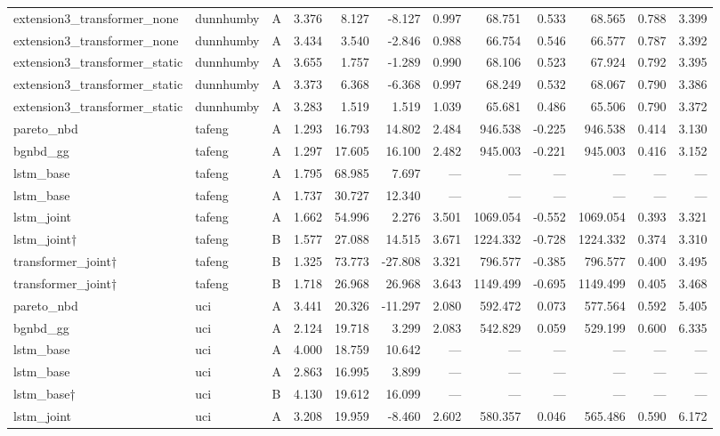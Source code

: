 \begin{table}
\begin{tabular}{lllrrrrrrrrr}
extension3_transformer_none & dunnhumby & A & 3.376 & 8.127 & -8.127 & 0.997 & 68.751 & 0.533 & 68.565 & 0.788 & 3.399 \\
extension3_transformer_none & dunnhumby & A & 3.434 & 3.540 & -2.846 & 0.988 & 66.754 & 0.546 & 66.577 & 0.787 & 3.392 \\
extension3_transformer_static & dunnhumby & A & 3.655 & 1.757 & -1.289 & 0.990 & 68.106 & 0.523 & 67.924 & 0.792 & 3.395 \\
extension3_transformer_static & dunnhumby & A & 3.373 & 6.368 & -6.368 & 0.997 & 68.249 & 0.532 & 68.067 & 0.790 & 3.386 \\
extension3_transformer_static & dunnhumby & A & 3.283 & 1.519 & 1.519 & 1.039 & 65.681 & 0.486 & 65.506 & 0.790 & 3.372 \\
pareto_nbd & tafeng & A & 1.293 & 16.793 & 14.802 & 2.484 & 946.538 & -0.225 & 946.538 & 0.414 & 3.130 \\
bgnbd_gg & tafeng & A & 1.297 & 17.605 & 16.100 & 2.482 & 945.003 & -0.221 & 945.003 & 0.416 & 3.152 \\
lstm_base & tafeng & A & 1.795 & 68.985 & 7.697 & — & — & — & — & — & — \\
lstm_base & tafeng & A & 1.737 & 30.727 & 12.340 & — & — & — & — & — & — \\
lstm_joint & tafeng & A & 1.662 & 54.996 & 2.276 & 3.501 & 1069.054 & -0.552 & 1069.054 & 0.393 & 3.321 \\
lstm_joint† & tafeng & B & 1.577 & 27.088 & 14.515 & 3.671 & 1224.332 & -0.728 & 1224.332 & 0.374 & 3.310 \\
transformer_joint† & tafeng & B & 1.325 & 73.773 & -27.808 & 3.321 & 796.577 & -0.385 & 796.577 & 0.400 & 3.495 \\
transformer_joint† & tafeng & B & 1.718 & 26.968 & 26.968 & 3.643 & 1149.499 & -0.695 & 1149.499 & 0.405 & 3.468 \\
pareto_nbd & uci & A & 3.441 & 20.326 & -11.297 & 2.080 & 592.472 & 0.073 & 577.564 & 0.592 & 5.405 \\
bgnbd_gg & uci & A & 2.124 & 19.718 & 3.299 & 2.083 & 542.829 & 0.059 & 529.199 & 0.600 & 6.335 \\
lstm_base & uci & A & 4.000 & 18.759 & 10.642 & — & — & — & — & — & — \\
lstm_base & uci & A & 2.863 & 16.995 & 3.899 & — & — & — & — & — & — \\
lstm_base† & uci & B & 4.130 & 19.612 & 16.099 & — & — & — & — & — & — \\
lstm_joint & uci & A & 3.208 & 19.959 & -8.460 & 2.602 & 580.357 & 0.046 & 565.486 & 0.590 & 6.172 \\

\end{tabular}
\end{table}
